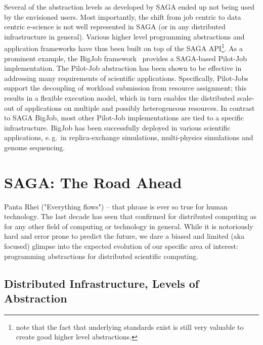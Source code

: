 \documentclass[]{article}
\begin{document}
  Several of the abstraction levels as developed by SAGA ended up not
  being used by the envisioned users.  Most importantly, the shift
  from job centric to data centric e-science is not well represented
  in SAGA (or in any distributed infrastructure in general).  Various
  higher level programming abstractions and application frameworks
  have thus been built on top of the SAGA API\footnote{note that the
  fact that underlying standards exist is still very valuable to
  create good higher level abstractions.}.  As a prominent example,
  the BigJob framework~\cite{saga_bigjob_condor_cloud}  provides a
  SAGA-based Pilot-Job implementation. The Pilot-Job abstraction has
  been shown to be effective in addressing many requirements of
  scientific applications.  Specifically, Pilot-Jobs support the
  decoupling of workload submission from resource assignment; this
  results in a flexible execution model, which in turn enables the
  distributed scale-out of applications on multiple and possibly
  heterogeneous resources. In contrast to SAGA BigJob, most other
  Pilot-Job implementations are tied to a specific infrastructure.
  BigJob has been successfully deployed in various scientific
  applications, e.\,g.\ in replica-exchange simulations, multi-physics
  simulations and genome sequencing.


\section{SAGA: The Road Ahead}
\label{sec:road}

 Panta Rhei ("Everything flows") -- that phrase is ever so true for
 human technology.  The last decade has seen that confirmed for
 distributed computing as for any other field of computing or
 technology in general.  While it is notoriously hard and error prone
 to predict the future, we dare a biased and limited (aka focused)
 glimpse into the expected evolution of our specific area of interest:
 programming abstractions for distributed scientific computing. 


\subsection{Distributed Infrastructure, Levels of Abstraction} 

\end{document}
